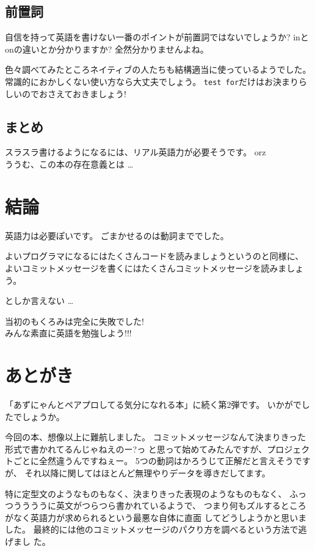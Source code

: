 \documentclass{jarticle}
\begin{document}
  \subsection{前置詞}
  自信を持って英語を書けない一番のポイントが前置詞ではないでしょうか?
  inとonの違いとか分かりますか? 全然分かりませんよね。

  色々調べてみたところネイティブの人たちも結構適当に使っているようでした。
  常識的におかしくない使い方なら大丈夫でしょう。
  {\tt test for}だけはお決まりらしいのでおさえておきましょう!

  \subsection{まとめ}
  スラスラ書けるようになるには、リアル英語力が必要そうです。 orz\\
  ううむ、この本の存在意義とは \dots

 \section{結論}
  英語力は必要ぽいです。
  ごまかせるのは動詞まででした。

  よいプログラマになるにはたくさんコードを読みましょうというのと同様に、
  よいコミットメッセージを書くにはたくさんコミットメッセージを読みましょ
  う。

  としか言えない \dots

  \begin{center}
  \Large
   当初のもくろみは完全に失敗でした!\\
   みんな素直に英語を勉強しよう!!!
  \end{center}


  \newpage
   \section*{あとがき}
  「あずにゃんとペアプロしてる気分になれる本」に続く第2弾です。
  いかがでしたでしょうか。

  今回の本、想像以上に難航しました。
  コミットメッセージなんて決まりきった形式で書かれてるんじゃねえのー?っ
  と思って始めてみたんですが、プロジェクトごとに全然違うんですねぇー。
  5つの動詞はかろうじて正解だと言えそうですが、
  それ以降に関してはほとんど無理やりデータを導きだしてます。

  特に定型文のようなものもなく、決まりきった表現のようなものもなく、
  ふっつううううに英文がつらつら書かれているようで、
  つまり何もズルするところがなく英語力が求められるという最悪な自体に直面
  してどうしようかと思いました。
  最終的には他のコミットメッセージのパクり方を調べるという方法で逃げまし
  た。
\end{document}
